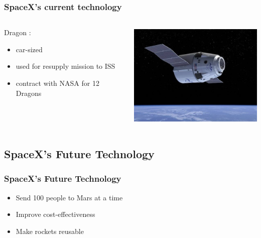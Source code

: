 {\begin{frame}
    \frametitle{SpaceX's current technology}
    \begin{columns}
        \begin{column}{50mm}
            Dragon :\\
            \vspace{1em}
            \begin{itemize}
                \item car-sized
                \item used for resupply mission to ISS
                \item contract with NASA for 12 Dragons
            \end{itemize}
        \end{column}
        \begin{column}{65mm}
\includegraphics[height=50mm]{images/dragon}
        \end{column}
    \end{columns}
\end{frame}
}

\subsection{SpaceX's Future Technology}

\begin{frame}
    \frametitle{SpaceX's Future Technology}
    \begin{itemize}
        \item Send 100 people to Mars at a time
        \item Improve cost-effectiveness
        \item Make rockets reusable
    \end{itemize}

\end{frame}

